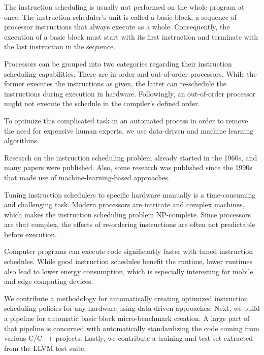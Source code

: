 The instruction scheduling is usually not performed on the whole program at once.
The instruction scheduler's unit is called a basic block, a sequence of processor instructions that always execute as a whole.
Consequently, the execution of a basic block must start with its first instruction and terminate with the last instruction in the sequence.

Processors can be grouped into two categories regarding their instruction scheduling capabilities.
There are in-order and out-of-order processors.
While the former executes the instructions as given, the latter can re-schedule the instructions during execution in hardware.
Followingly, an out-of-order processor might not execute the schedule in the compiler's defined order.

To optimize this complicated task in an automated process in order to remove the need for expensive human experts, we use data-driven and machine learning algorithms.

Research on the instruction scheduling problem already started in the 1960s, and many papers were published.
Also, some research was published since the 1990s that made use of machine-learning-based approaches.

Tuning instruction schedulers to specific hardware manually is a time-consuming and challenging task.
Modern processors are intricate and complex machines, which makes the instruction scheduling problem NP-complete.
Since processors are that complex, the effects of re-ordering instructions are often not predictable before execution.

Computer programs can execute code significantly faster with tuned instruction schedules. 
While good instruction schedules benefit the runtime, lower runtimes also lead to lower energy consumption, which is especially interesting for mobile and edge computing devices.

We contribute a methodology for automatically creating optimized instruction scheduling policies for any hardware using data-driven approaches.
Next, we build a pipeline for automatic basic block micro-benchmark creation.
A large part of that pipeline is concerned with automatically standardizing the code coming from various C/C++ projects.
Lastly, we contribute a training and test set extracted from the LLVM test suite.

